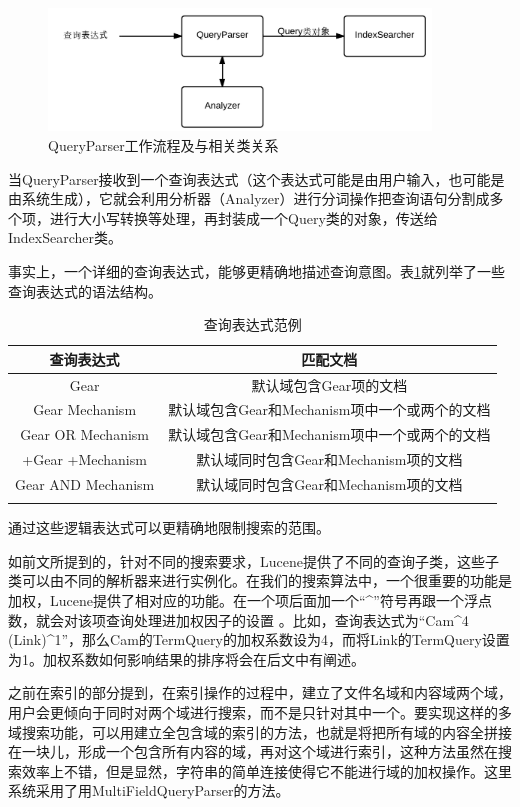 \documentclass[12pt,a4paper]{article}
\begin{document}
	\begin{figure}[htbp] 
	\centering\includegraphics[width=4in]{fig/QueryParser.png} 
	\caption{QueryParser工作流程及与相关类关系}\label{fig:QueryParser} 
	\end{figure} 
	
	当QueryParser接收到一个查询表达式（这个表达式可能是由用户输入，也可能是由系统生成），它就会利用分析器（Analyzer）进行分词操作把查询语句分割成多个项，进行大小写转换等处理，再封装成一个Query类的对象，传送给IndexSearcher类。
	
	事实上，一个详细的查询表达式，能够更精确地描述查询意图。表\ref{tb:查询表达式范例}就列举了一些查询表达式的语法结构。
	
\begin{table}[htbp]
\centering
\caption{\label{tb:查询表达式范例}查询表达式范例}
\begin{tabular}{c|c}
\Xhline{1.5pt}
 查询表达式 & 匹配文档\\
\hline
 Gear  & 默认域包含Gear项的文档 \\
\hline
 Gear Mechanism  & 默认域包含Gear和Mechanism项中一个或两个的文档\\
\hline
 Gear  OR Mechanism  & 默认域包含Gear和Mechanism项中一个或两个的文档\\
\hline
 +Gear +Mechanism  & 默认域同时包含Gear和Mechanism项的文档\\
\hline
 Gear  AND Mechanism  & 默认域同时包含Gear和Mechanism项的文档\\
\Xhline{1.5pt}
\end{tabular}
\end{table}
	通过这些逻辑表达式可以更精确地限制搜索的范围。
	
	如前文所提到的，针对不同的搜索要求，Lucene提供了不同的查询子类，这些子类可以由不同的解析器来进行实例化。在我们的搜索算法中，一个很重要的功能是加权，Lucene提供了相对应的功能。在一个项后面加一个“\^{}”符号再跟一个浮点数，就会对该项查询处理进加权因子的设置 。比如，查询表达式为“Cam\^{}4 (Link)\^{}1”，那么Cam的TermQuery的加权系数设为4，而将Link的TermQuery设置为1。加权系数如何影响结果的排序将会在后文中有阐述。
	
	之前在索引的部分提到，在索引操作的过程中，建立了文件名域和内容域两个域，用户会更倾向于同时对两个域进行搜索，而不是只针对其中一个。要实现这样的多域搜索功能，可以用建立全包含域的索引的方法，也就是将把所有域的内容全拼接在一块儿，形成一个包含所有内容的域，再对这个域进行索引，这种方法虽然在搜索效率上不错，但是显然，字符串的简单连接使得它不能进行域的加权操作。这里系统采用了用MultiFieldQueryParser的方法。
	
\end{document}
